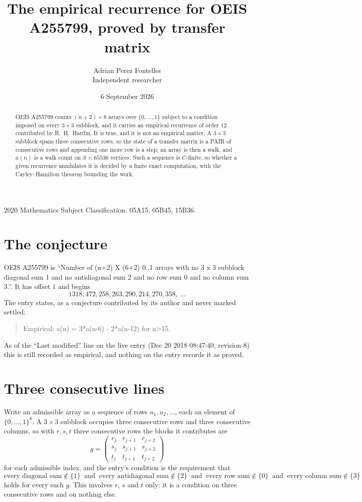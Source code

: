 \documentclass[11pt,a4paper]{article}
\title{The empirical recurrence for OEIS A255799, proved by transfer matrix}
\author{Adrian Perez Fontelles\\ \small Independent researcher}
\date{6 September 2026}
\theoremstyle{plain}
\theoremstyle{definition}
\begin{document}
\maketitle

\begin{abstract}
OEIS A255799 counts $(n+2)\times8$ arrays over $\{0,\dots,1\}$ subject to a condition imposed on
every $3\times3$ subblock, and it carries an empirical recurrence of order $12$
contributed by R.~H.~Hardin. It is true, and it is not an empirical matter. A $3\times3$
subblock spans three consecutive rows, so the state of a transfer matrix is a PAIR of
consecutive rows and appending one more row is a step; an array is then a walk, and
$a(n)$ is a walk count on $S=65536$ vertices. Such a sequence is $C$-finite, so whether a given
recurrence annihilates it is decided by a finite exact computation, with the Cayley--Hamilton
theorem bounding the work.
\end{abstract}

\noindent\small 2020 Mathematics Subject Classification. 05A15, 05B45, 15B36.\normalsize

\section{The conjecture}

OEIS A255799 is ``Number of (n+2) X (6+2) 0..1 arrays with no 3 x 3 subblock diagonal sum 1 and no antidiagonal sum 2 and no row sum 0 and no column sum 3.''. It has offset $1$ and begins
\[
1318, 472, 258, 263, 290, 214, 270, 358,\ \dots
\]
The entry states, as a conjecture contributed by its author and never marked settled:
\begin{quote}
Empirical: a(n) = 3*a(n-6) - 2*a(n-12) for n>15.
\end{quote}
As of the ``Last modified'' line on the live entry (Dec 20 2018 08:47:40, revision 8) this is still
recorded as empirical, and nothing on the entry records it as proved.

\section{Three consecutive lines}

Write an admissible array as a sequence of rows $u_1,u_2,\dots$, each an element of
$\{0,\dots,1\}^{8}$. A $3\times3$ subblock occupies three consecutive rows and
three consecutive columns, so with $r,s,t$ three consecutive rows the blocks it
contributes are
\[
g=\begin{pmatrix}r_j&r_{j+1}&r_{j+2}\\ s_j&s_{j+1}&s_{j+2}\\ t_j&t_{j+1}&t_{j+2}\end{pmatrix}
\]
for each admissible index, and the entry's condition is the requirement that
\[
\text{every diagonal sum} \notin \{1\}\ \text{ and }\ \text{every antidiagonal sum} \notin \{2\}\ \text{ and }\ \text{every row sum} \notin \{0\}\ \text{ and }\ \text{every column sum} \notin \{3\}
\]
holds for every such $g$. This involves $r$, $s$ and $t$ only: it is a condition on
three consecutive rows and on nothing else.
\end{document}
